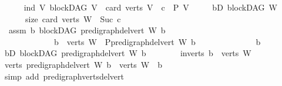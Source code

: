 \begin{isabellebody}
\ \ \ \ \isamarkupfalse%
\ ind{\isacharcolon}{\kern0pt}\ {\isachardoublequoteopen}{\isasymAnd}V{\isachardot}{\kern0pt}\ {\isacharparenleft}{\kern0pt}blockDAG\ V\ {\isasymLongrightarrow}\ card\ {\isacharparenleft}{\kern0pt}verts\ V{\isacharparenright}{\kern0pt}\ {\isacharequal}{\kern0pt}\ c\ {\isasymLongrightarrow}\ P\ V{\isacharparenright}{\kern0pt}{\isachardoublequoteclose}\isanewline
\ \ \ \ \ bD{\isacharcolon}{\kern0pt}\ {\isachardoublequoteopen}blockDAG\ W{\isachardoublequoteclose}\isanewline
\ \ \ \ \ \ size{\isacharcolon}{\kern0pt}\ {\isachardoublequoteopen}card\ {\isacharparenleft}{\kern0pt}verts\ W{\isacharparenright}{\kern0pt}\ {\isacharequal}{\kern0pt}\ Suc\ c{\isachardoublequoteclose}\isanewline
\ \ \ \ \isamarkupfalse%
\ \ assm{}{\isacharcolon}{\kern0pt}\ {\isachardoublequoteopen}{\isasymAnd}b{\isachardot}{\kern0pt}\ blockDAG\ {\isacharparenleft}{\kern0pt}pre{\isacharunderscore}{\kern0pt}digraph{\isachardot}{\kern0pt}del{\isacharunderscore}{\kern0pt}vert\ W\ b{\isacharparenright}{\kern0pt}\ \isanewline
\ \ \ \ \ \ \ \ \ \ \ \ {\isasymLongrightarrow}\ b\ {\isasymin}\ verts\ W\ {\isasymLongrightarrow}\ P{\isacharparenleft}{\kern0pt}pre{\isacharunderscore}{\kern0pt}digraph{\isachardot}{\kern0pt}del{\isacharunderscore}{\kern0pt}vert\ W\ b{\isacharparenright}{\kern0pt}{\isachardoublequoteclose}\isanewline
\ \ \ \ \isamarkupfalse%
\ {\isacharminus}{\kern0pt}\isanewline
\ \ \ \ \ \ \isamarkupfalse%
\ b\isanewline
\ \ \ \ \ \ \isamarkupfalse%
\ bD{}{\isacharcolon}{\kern0pt}\ {\isachardoublequoteopen}blockDAG\ {\isacharparenleft}{\kern0pt}pre{\isacharunderscore}{\kern0pt}digraph{\isachardot}{\kern0pt}del{\isacharunderscore}{\kern0pt}vert\ W\ b{\isacharparenright}{\kern0pt}{\isachardoublequoteclose}\isanewline
\ \ \ \ \ \ \isamarkupfalse%
\ in{\isacharunderscore}{\kern0pt}verts{\isacharcolon}{\kern0pt}\ {\isachardoublequoteopen}b\ {\isasymin}\ verts\ W{\isachardoublequoteclose}\isanewline
\ \ \ \ \ \ \isamarkupfalse%
\ {\isachardoublequoteopen}verts\ {\isacharparenleft}{\kern0pt}pre{\isacharunderscore}{\kern0pt}digraph{\isachardot}{\kern0pt}del{\isacharunderscore}{\kern0pt}vert\ W\ b{\isacharparenright}{\kern0pt}\ {\isacharequal}{\kern0pt}\ verts\ W\ {\isacharminus}{\kern0pt}\ {\isacharbraceleft}{\kern0pt}b{\isacharbraceright}{\kern0pt}{\isachardoublequoteclose}\isanewline
\ \ \ \ \ \ \ \ \isamarkupfalse%
\ {\isacharparenleft}{\kern0pt}simp\ add{\isacharcolon}{\kern0pt}\ pre{\isacharunderscore}{\kern0pt}digraph{\isachardot}{\kern0pt}verts{\isacharunderscore}{\kern0pt}del{\isacharunderscore}{\kern0pt}vert{\isacharparenright}{\kern0pt}\ \isanewline

\end{isabellebody}
